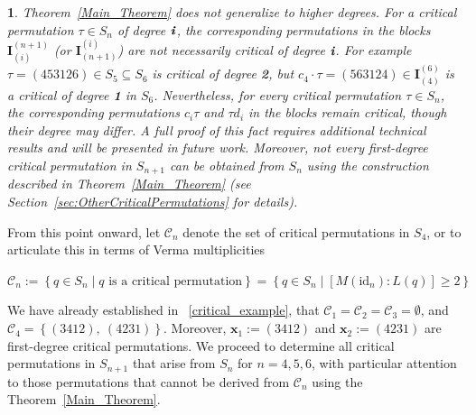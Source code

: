\documentclass[a4 paper,12pt]{article}
\newtheorem{numeris}{}[section]
\begin{document}
\begin{numeris} Theorem~\ref{Main_Theorem}  does not generalize to higher degrees. For a critical permutation $\tau \in S_n$ of degree $\textbf{\textit{i}}$, the corresponding  permutations in the \textit{blocks} $\textbf{I}_{(i)}^{(n+1)}$ (or $\textbf{I}_{(n+1)}^{(i)}$) are not necessarily critical of degree $\textit{\textbf{i}}$. For example $\tau = (453126)\in S_5\subseteq S_6$ is critical of degree \textit{\textbf{2}}, but $c_4\cdot  \tau  = (563124)\in \textbf{I}_{(4)}^{(6)}$ is a critical   of degree \textit{\textbf{1}} in $S_6$.
 Nevertheless, for every critical permutation $\tau \in S_n$, the corresponding permutations $c_i \tau$ and $\tau d_i$ in the blocks remain critical, though their degree may differ. A full proof of this fact requires additional technical results and will be presented in future work.
Moreover, not every first-degree critical permutation in $S_{n+1}$ can be obtained from $S_n$ using the construction described in Theorem~\ref{Main_Theorem} (see Section~\ref{sec:OtherCriticalPermutations} for details).
\label{not_generalizable}
\end{numeris}


From this point onward,  let $\mathcal{C}_{n}$ denote the set of critical permutations in $S_4$, or to articulate this in terms of Verma multiplicities
\begin{center}
$\mathcal{C}_n := \left\{q\in S_n \mid q \textrm{ is a critical permutation} \right\} = \left\{q\in S_n \mid \left[M(\textrm{id}_n):L(q)\right]\geq 2\right\}$
\end{center}
We have already established in ~\ref{critical_example}, that $\mathcal{C}_1 = \mathcal{C}_2= \mathcal{C}_3 = \emptyset$, and  $\mathcal{C}_4 = \left\{ (3412) , \   (4231)\right\}$. Moreover,   $\textbf{x}_1 := (3412) $ and  $\textbf{x}_2 := (4231)$  are first-degree critical permutations.  
We proceed to determine all critical permutations in $S_{n+1}$ that arise from $S_n$ for $n=4,5,6$, with particular attention to those permutations that cannot be derived from  $\mathcal{C}_n$ using  the Theorem~\ref{Main_Theorem}.
\end{document}
